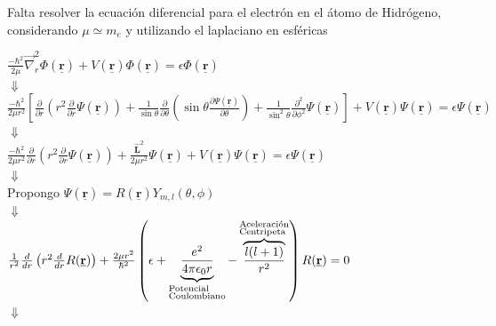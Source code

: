 \documentclass[oneside]{book}
\numberwithin{equation}{section}
\numberwithin{figure}{section}
\numberwithin{table}{section}
\newcommand{\vect}[1]{\underline{\textbf{#1}}}
\begin{document}
					Falta resolver la ecuación diferencial para el electrón en el átomo de Hidrógeno, considerando $\mu \simeq m_e$ y utilizando el laplaciano en esféricas\\
					
					\begin{center}
						$\frac{-\hbar^2}{2\mu}\vec{\nabla}_r^2\Phi(\vect{r})+V(\vect{r})\Phi(\vect{r})=\epsilon \Phi(\vect{r})$\\
						
						$\Downarrow$\\
						
						$\frac{-\hbar^2}{2\mu r^2}\left[\frac{\partial}{\partial r}\left( r^2 \frac{\partial}{\partial r}\Psi(\vect{r})\right)+\frac{1}{\sin \theta}\frac{\partial}{\partial \theta}\left( \sin \theta \frac{\partial \Psi(\vect{r})}{\partial \theta}\right)+\frac{1}{\sin^2 \theta}\frac{\partial^2}{\partial \phi^2}\Psi(\vect{r}) \right]+V(\vect{r})\Psi(\vect{r})=\epsilon \Psi(\vect{r})$\\
						
						$\Downarrow$\\
						
						$\frac{-\hbar^2}{2\mu r^2}\frac{\partial}{\partial r}\left( r^2 \frac{\partial}{\partial r}\Psi(\vect{r})\right)+\frac{\hat{\vect{L}}^2}{2\mu r^2}\Psi(\vect{r})+V(\vect{r})\Psi(\vect{r})=\epsilon \Psi(\vect{r})$\\
								
						$\Downarrow$\\				
					
						Propongo $\Psi(\vect{r})=R(\vect{r})Y_{m,l}(\theta,\phi)$\\
						
						$\Downarrow$\\
						
						$\frac{1}{r^2}\frac{d}{dr}\left(r^2 \frac{d}{dr}R(\vect{r})\right)+\frac{2\mu r^2}{\hbar^2}\left(\epsilon+\underbrace{\frac{e^2}{4\pi \epsilon_0 r}}_{\begin{subarray}{l}\text{Potencial}\\ \text{Coulombiano}\end{subarray}}-\overbrace{\frac{l(l+1)}{r^2}}^{\begin{subarray}{l}\text{Aceleración}\\ \text{Centripeta}\end{subarray}}\right)R(\vect{r})=0$\\
						
						$\Downarrow$\\
						

\end{center}
\end{document}
